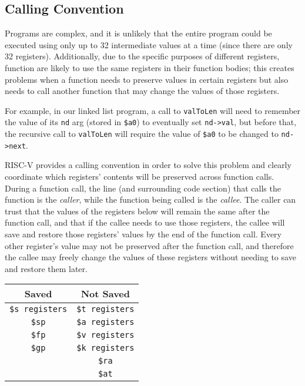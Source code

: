 \documentclass{article}
\begin{document}
\subsection{Calling Convention}
Programs are complex, and it is unlikely that the entire program could be executed using only up to 32 intermediate values at a time (since there are only 32 registers). Additionally, due to the specific purposes of different registers, function are likely to use the same registers in their function bodies; this creates problems when a function needs to preserve values in certain registers but also needs to call another function that may change the values of those registers. 

For example, in our linked list program, a call to \texttt{valToLen} will need to remember the value of its \texttt{nd} arg (stored in \texttt{\$a0}) to eventually set \texttt{nd->val}, but before that, the recursive call to \texttt{valToLen} will require the value of \texttt{\$a0} to be changed to \texttt{nd->next}.

RISC-V provides a calling convention in order to solve this problem and clearly coordinate which registers' contents will be preserved across function calls. During a function call, the line (and surrounding code section) that calls the function is the \textit{caller}, while the function being called is the \textit{callee}. The caller can trust that the values of the registers below will remain the same after the function call, and that if the callee needs to use those registers, the callee will save and restore those registers' values by the end of the function call. Every other register's value may not be preserved after the function call, and therefore the callee may freely change the values of these registers without needing to save and restore them later.
\begin{center}
 \begin{tabular}{||c c||} 
 \hline
 \textbf{Saved} & \textbf{Not Saved}\\
 \hline
 \texttt{\$s registers} & \texttt{\$t registers}\\ 
 \texttt{\$sp} & \texttt{\$a registers} \\
 \texttt{\$fp} & \texttt{\$v registers}\\ 
 \texttt{\$gp} & \texttt{\$k registers}\\ 
 \texttt{\ } & \texttt{\$ra}\\ 
 \texttt{\ } & \texttt{\$at}\\ 
 \hline
\end{tabular}
\end{center}
\end{document}
